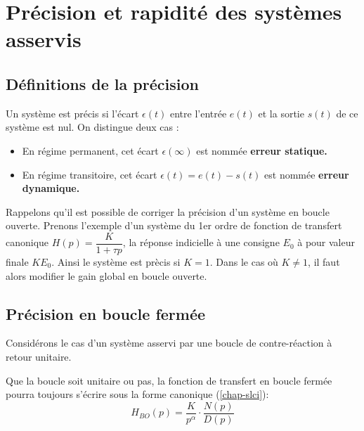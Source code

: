 \chapter{Précision et rapidité des systèmes asservis\label{chap-perf}}

\minitoc
\newpage

\section{Définitions de la précision}

Un système est précis si l'écart $\epsilon(t)$ entre l'entrée $e(t)$ et la sortie $s(t)$ 
de ce système est nul.
On distingue deux cas :
\begin{itemize}
    \item En régime permanent, cet écart $\epsilon(\infty)$ est nommée \textbf{erreur statique.}
    \item En régime transitoire, cet écart $\epsilon(t)=e(t)-s(t)$ est nommée \textbf{erreur dynamique.}
\end{itemize}

Rappelons qu'il est possible de corriger la précision 
d'un système en boucle ouverte. Prenons l'exemple d'un système du 1er ordre
de fonction de transfert canonique $H(p)=\dfrac{K}{1+\tau p}$, la réponse indicielle à 
une consigne $E_0$ à pour valeur finale $KE_0$. Ainsi le système est prècis si
$K=1$. Dans le cas où $K\neq1$, il faut alors modifier le gain global en boucle 
ouverte.

\section{Précision en boucle fermée}
Considérons le cas d'un système asservi par une boucle de contre-réaction à retour unitaire.

\begin{center}
\end{center}
Que la boucle soit unitaire ou pas, la fonction de transfert en boucle 
fermée pourra toujours s'écrire sous la forme canonique (\cref{chap-slci}):
$$
H_{BO}(p)=\dfrac{K}{p^\alpha}\cdot\dfrac{N(p)}{D(p)}
$$

